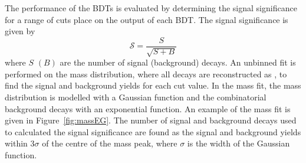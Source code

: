 The performance of the BDTs is evaluated by determining the signal significance for a range of cuts place on the output of each BDT. The signal significance is given by
\begin{equation}
\mathcal{S} = \frac{S}{\sqrt{S+B}}
\label{eq:SigSigf}
\end{equation}
where $S$ $(B)$ are the number of signal (background) decays.
An unbinned \ml fit is performed on the \bhh mass distribution, where all \bhh decays are reconstructed as \bsmumu, to find the signal and background yields for each cut value. %
In the mass fit, the \bhh mass distribution is modelled with a Gaussian function and the combinatorial background decays with an exponential function. An example of the mass fit is given in Figure~\ref{fig:massEG}. 
The number of signal and background decays used to calculated the signal significance are found as the signal and background yields within 3$\sigma$ of the centre of the \bhh mass peak, where $\sigma$ is the width of the Gaussian function.

